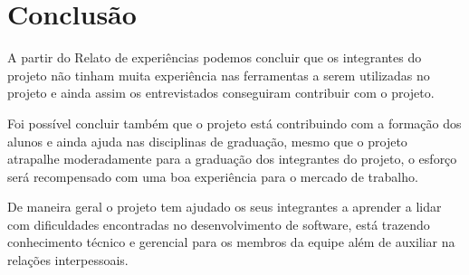 \section{Conclusão}
\label{sec:conclusao}

A partir do Relato de experiências podemos concluir que os integrantes do projeto não tinham muita experiência nas ferramentas a serem utilizadas no projeto e ainda assim os entrevistados conseguiram contribuir com o projeto.

Foi possível concluir também que o projeto está contribuindo com a formação dos alunos  e ainda ajuda nas disciplinas de graduação, mesmo que o projeto atrapalhe moderadamente para a graduação dos integrantes do projeto, o esforço será recompensado com uma boa experiência para o mercado de trabalho.

De maneira geral o projeto tem ajudado os seus integrantes a aprender a lidar com dificuldades encontradas no desenvolvimento de software, está trazendo conhecimento técnico e gerencial para os membros da equipe além de auxiliar na relações interpessoais.